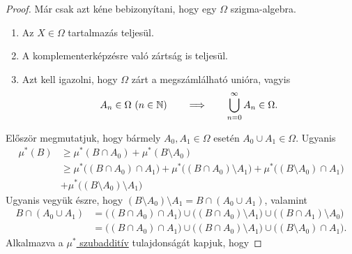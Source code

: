\documentclass[
]{elteikthesis}[2024/04/26]
\begin{document}
\begin{proof}
		Már csak azt kéne bebizonyítani, hogy egy \( \Omega \) szigma-algebra.
		\begin{enumerate}
			\item Az \( X \in \Omega \) tartalmazás teljesül. \checkmark
			\item A komplementerképzésre való zártság is teljesül. \checkmark
			\item Azt kell igazolni, hogy \( \Omega \) zárt a megszámlálható unióra, vagyis
			\[
				A_n \in \Omega \ (n \in \mathbb{N})
				\qquad \Longrightarrow \qquad
				\bigcup_{n=0}^{\infty} A_n \in \Omega.
			\]
		\end{enumerate}
		Először megmutatjuk, 
		hogy bármely \( A_0, A_1 \in \Omega \) esetén \( A_0 \cup A_1 \in \Omega \). Ugyanis
		\begin{align*}
			\mu^*(B) 
			&\geq \mu^*(B \cap A_0) + \mu^*(B \setminus A_0) \\
			&\geq \mu^* \bigl( (B \cap A_0) \cap A_1 \bigr) + 
				  \mu^* \bigl( (B \cap A_0) \setminus A_1 \bigr) +
				  \mu^* \bigl( (B \setminus A_0) \cap A_1 \bigr) \\
			&+    \mu^* \bigl( (B \setminus A_0) \setminus A_1 \bigr)
		\end{align*}
		Ugyanis vegyük észre, 
		hogy \( (B \setminus A_0) \setminus A_1 = B \cap (A_0 \cup A_1) \), valamint
		\begin{align*}
			B \cap (A_0 \cup A_1)
			&= \bigl( (B \cap A_0) \cap A_1 \bigr) \cup
			   \bigl( (B \cap A_0) \setminus A_1 \bigr) \cup
			   \bigl( (B \cap A_1) \setminus A_0 \bigr) \\
			&= \bigl( (B \cap A_0) \cap A_1 \bigr) \cup
			   \bigl( (B \cap A_0) \setminus A_1 \bigr) \cup
			   \bigl( (B \setminus A_0) \cap A_1 \bigr).
		\end{align*}
		Alkalmazva a \hyperref[eq:mu-csillag-szubadditív]{\( \mu^* \) szubadditív} 
		tulajdonságát kapjuk, hogy 

\end{proof}
\end{document}
